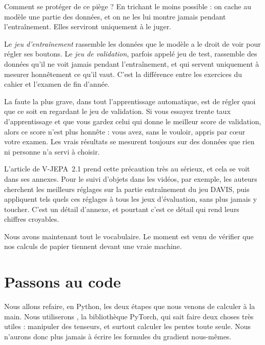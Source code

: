 Comment se protéger de ce piège ? En trichant le moins possible : on cache
au modèle une partie des données, et on ne les lui montre jamais pendant
l'entraînement. Elles serviront uniquement à le juger.

\begin{definition}
Le \emph{jeu d'entraînement} rassemble les données que le modèle a le droit
de voir pour régler ses boutons. Le \emph{jeu de validation}, parfois appelé
jeu de test, rassemble des données qu'il ne voit jamais pendant
l'entraînement, et qui servent uniquement à mesurer honnêtement ce qu'il
vaut. C'est la différence entre les exercices du cahier et l'examen de fin
d'année.
\end{definition}

\begin{piege}
La faute la plus grave, dans tout l'apprentissage automatique, est de régler
quoi que ce soit en regardant le jeu de validation. Si vous essayez trente
taux d'apprentissage et que vous gardez celui qui donne le meilleur score de
validation, alors ce score n'est plus honnête : vous avez, sans le vouloir,
appris par cœur votre examen. Les vrais résultats se mesurent toujours sur
des données que rien ni personne n'a servi à choisir.
\end{piege}

\begin{enia}
L'article de V-JEPA~2.1 prend cette précaution très au sérieux, et cela se
voit dans ses annexes. Pour le suivi d'objets dans les vidéos, par exemple,
les auteurs cherchent les meilleurs réglages sur la partie entraînement du
jeu DAVIS, puis appliquent tels quels ces réglages à tous les jeux
d'évaluation, sans plus jamais y toucher. C'est un détail d'annexe, et
pourtant c'est ce détail qui rend leurs chiffres croyables.
\end{enia}

Nous avons maintenant tout le vocabulaire. Le moment est venu de vérifier
que nos calculs de papier tiennent devant une vraie machine.

\section{Passons au code}

Nous allons refaire, en Python, les deux étapes que nous venons de calculer
à la main. Nous utiliserons , la bibliothèque PyTorch, qui
sait faire deux choses très utiles : manipuler des tenseurs, et surtout
calculer les pentes toute seule. Nous n'aurons donc plus jamais à écrire les
formules du gradient nous-mêmes.

